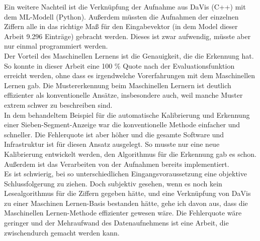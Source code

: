 Ein weitere Nachteil ist die Verknüpfung der Aufnahme aus DaVis (C++) mit dem ML-Modell (Python). Außerdem müssten die Aufnahmen der einzelnen Ziffern alle in das richtige Maß für den Eingabevektor (in dem Model dieser Arbeit 9.296 Einträge) gebracht werden. Dieses ist zwar aufwendig, müsste aber  nur einmal programmiert werden.\\
Der Vorteil des Maschinellen Lernens ist die Genauigkeit, die die Erkennung hat. So konnte in dieser Arbeit eine 100 \% Quote nach der Evaluationsfunktion erreicht werden,  ohne dass es irgendwelche Vorerfahrungen mit dem Maschinellen Lernen gab.  Die Mustererkennung beim Maschinellen Lernern ist deutlich effizienter als konventionelle Ansätze, insbesondere auch, weil manche Muster extrem schwer zu beschreiben sind.\\
In dem behandeltem Beispiel für die automatische Kalibrierung und Erkennung einer Sieben-Segment-Anzeige war die konventionelle Methode einfacher und schneller. 
Die Fehlerquote ist aber höher und die gesamte Software und Infrastruktur ist für diesen Ansatz ausgelegt. So musste nur eine neue Kalibrierung entwickelt werden, den Algorithmus für die Erkennung gab es schon. Außerdem ist das Verarbeiten von der Aufnahmen bereits implementiert. \\
Es ist schwierig, bei so unterschiedlichen Eingangsvoraussetzung eine objektive Schlussfolgerung zu ziehen.  Doch subjektiv gesehen, wenn es noch kein Lesealgorithmus für die Ziffern gegeben hätte, und eine Verknüpfung von DaVis zu einer Maschinen Lernen-Basis bestanden hätte, gehe ich davon aus, dass die Maschinellen Lernen-Methode effizienter gewesen wäre.  Die Fehlerquote wäre geringer und der Mehraufwand des Datenaufnehmens ist eine Arbeit,  die zwischendurch gemacht werden kann.

